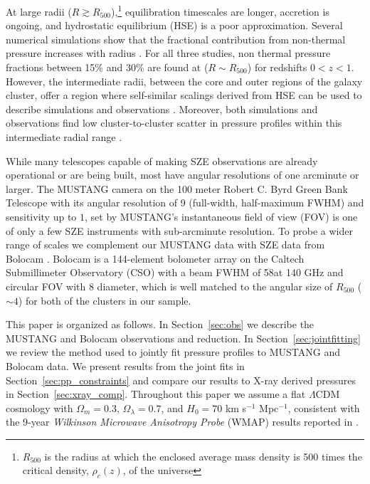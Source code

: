 \documentclass[iop,numberedappendix,apj]{emulateapj}
\begin{document}
At large radii ($R \gtrsim R_{500}$),\footnote{$R_{500}$
is the radius at which the enclosed average mass density is 500 times the critical density, 
$\rho_c(z)$, of the universe} equilibration timescales are longer, accretion is ongoing, 
and hydrostatic equilibrium (HSE) is a poor approximation. 
Several numerical simulations show that the fractional contribution
 from non-thermal pressure increases with radius \citep{shaw2010,battaglia2012,nelson2014}. 
For all three studies, non thermal pressure fractions between 15\% and 30\% are found at ($R \sim R_{500}$)
for redshifts $0 < z < 1$. However, the intermediate radii, between the core and outer regions of the 
galaxy cluster, offer a region where self-similar scalings derived from HSE can be used to describe simulations 
and observations \citep[e.g.][]{kravtsov2012}. Moreover, both simulations and observations find low
cluster-to-cluster scatter in pressure profiles within this intermediate radial range \citep[e.g.][]{borgani2004,
nagai2007,arnaud2010,bonamente2012,planck2013a,sayers2013}.

While many telescopes capable of making SZE observations are already operational or are being built, most have
angular resolutions of one arcminute or larger. The MUSTANG camera \citep{dicker2008}
on the 100 meter Robert C. Byrd Green Bank Telescope \citep[GBT, ][]{jewell2004} with its angular resolution of 9\asec 
(full-width, half-maximum FWHM) and sensitivity up to $1$\amin, set by MUSTANG's instantaneous field of view (FOV)
is one of only a few SZE instruments with sub-arcminute resolution.
To probe a wider range of scales we complement our MUSTANG data with SZE data from Bolocam \citep{glenn1998}. 
Bolocam is a 144-element bolometer
array on the Caltech Submillimeter Observatory (CSO) with a beam FWHM of 58\asecs at 140 GHz and circular FOV with 8\amins 
diameter, which is well matched to the angular size of $R_{500}$ ($\sim 4$\amin) for both of the clusters in our sample. 

This paper is organized as follows. In Section~\ref{sec:obs} we describe the MUSTANG and Bolocam observations and reduction. 
In Section~\ref{sec:jointfitting} we review the method used to jointly fit pressure profiles to MUSTANG and Bolocam data. We
present results from the joint fits in Section~\ref{sec:pp_constraints} and compare our results to X-ray derived pressures 
in Section~\ref{sec:xray_comp}. 
Throughout this paper we assume a flat $\Lambda$CDM cosmology with $\Omega_m = 0.3$, $\Omega_{\lambda} = 0.7$, and $H_0 = 70$ 
km s$^{-1}$ Mpc$^{-1}$, consistent with the 9-year \emph{Wilkinson Microwave Anisotropy Probe} (WMAP) results reported in
 \cite{hinshaw2013}.
\end{document}
